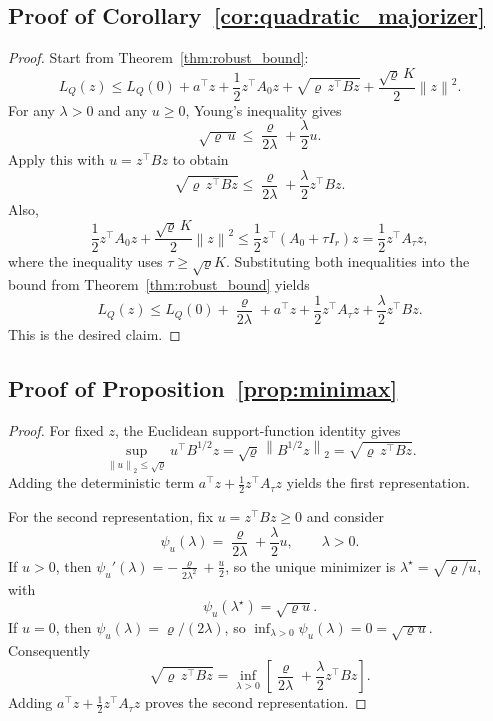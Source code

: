 \documentclass{article}
\newcommand{\norm}[1]{\left\lVert #1 \right\rVert}
\newcommand{\paren}[1]{\left( #1 \right)}
\newcommand{\bracks}[1]{\left[ #1 \right]}
\begin{document}
\subsection{Proof of Corollary~\ref{cor:quadratic_majorizer}}

\begin{proof}
Start from Theorem~\ref{thm:robust_bound}:
\[
L_Q(z)
\le
L_Q(0)
+
a^\top z + \frac12 z^\top A_0 z
+
\sqrt{\varrho\, z^\top B z}
+
\frac{\sqrt{\varrho}\,K}{2}\norm{z}^2.
\]
For any \(\lambda>0\) and any \(u\ge 0\), Young's inequality gives
\[
\sqrt{\varrho\,u}
\le
\frac{\varrho}{2\lambda} + \frac{\lambda}{2}u.
\]
Apply this with \(u=z^\top B z\) to obtain
\[
\sqrt{\varrho\, z^\top B z}
\le
\frac{\varrho}{2\lambda}
+
\frac{\lambda}{2} z^\top B z.
\]
Also,
\[
\frac12 z^\top A_0 z + \frac{\sqrt{\varrho}\,K}{2}\norm{z}^2
\le
\frac12 z^\top \paren{A_0 + \tau I_r}z
=
\frac12 z^\top A_\tau z,
\]
where the inequality uses \(\tau\ge \sqrt{\varrho}K\). Substituting both inequalities into the bound from Theorem~\ref{thm:robust_bound} yields
\[
L_Q(z)
\le
L_Q(0) + \frac{\varrho}{2\lambda}
+
a^\top z
+
\frac12 z^\top A_\tau z
+
\frac{\lambda}{2} z^\top B z.
\]
This is the desired claim.
\end{proof}

\subsection{Proof of Proposition~\ref{prop:minimax}}

\begin{proof}
For fixed \(z\), the Euclidean support-function identity gives
\[
\sup_{\norm{u}_2\le \sqrt{\varrho}} u^\top B^{1/2}z
=
\sqrt{\varrho}\,\norm{B^{1/2}z}_2
=
\sqrt{\varrho\, z^\top B z}.
\]
Adding the deterministic term \(a^\top z + \frac12 z^\top A_\tau z\) yields the first representation.

For the second representation, fix \(u=z^\top B z\ge 0\) and consider
\[
\psi_u(\lambda)=\frac{\varrho}{2\lambda} + \frac{\lambda}{2}u,
\qquad \lambda>0.
\]
If \(u>0\), then \(\psi_u'(\lambda) = -\frac{\varrho}{2\lambda^2} + \frac{u}{2}\), so the unique minimizer is \(\lambda^\star=\sqrt{\varrho/u}\), with
\[
\psi_u(\lambda^\star)=\sqrt{\varrho u}.
\]
If \(u=0\), then \(\psi_u(\lambda)=\varrho/(2\lambda)\), so \(\inf_{\lambda>0}\psi_u(\lambda)=0=\sqrt{\varrho u}\). Consequently
\[
\sqrt{\varrho\, z^\top B z}
=
\inf_{\lambda>0}
\bracks{
\frac{\varrho}{2\lambda} + \frac{\lambda}{2}z^\top B z
}.
\]
Adding \(a^\top z + \frac12 z^\top A_\tau z\) proves the second representation.
\end{proof}
\end{document}
